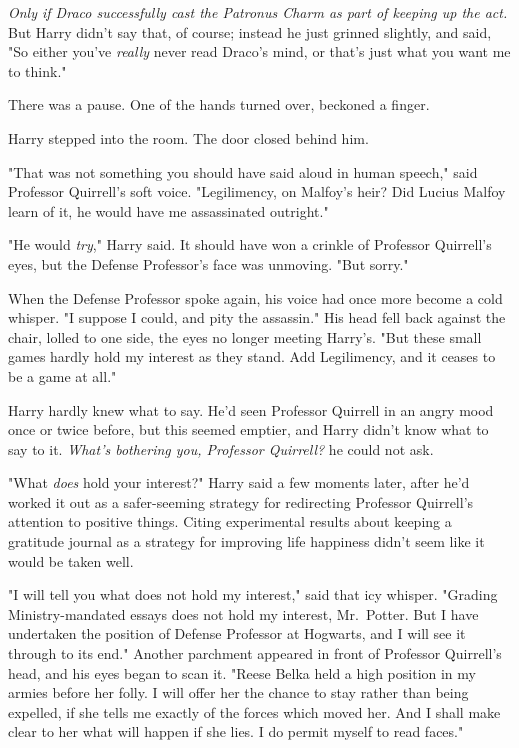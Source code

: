 \emph{Only if Draco successfully cast the Patronus Charm as part of keeping up
the act.} But Harry didn't say that, of course; instead he just grinned
slightly, and said, "So either you've \emph{really} never read Draco's mind, or
that's just what you want me to think."

There was a pause. One of the hands turned over, beckoned a finger.

Harry stepped into the room. The door closed behind him.

"That was not something you should have said aloud in human speech," said
Professor Quirrell's soft voice. "Legilimency, on Malfoy's heir? Did Lucius
Malfoy learn of it, he would have me assassinated outright."

"He would \emph{try}," Harry said. It should have won a crinkle of Professor
Quirrell's eyes, but the Defense Professor's face was unmoving. "But sorry."

When the Defense Professor spoke again, his voice had once more become a cold
whisper. "I suppose I could, and pity the assassin." His head fell back against
the chair, lolled to one side, the eyes no longer meeting Harry's. "But these
small games hardly hold my interest as they stand. Add Legilimency, and it
ceases to be a game at all."

Harry hardly knew what to say. He'd seen Professor Quirrell in an angry mood
once or twice before, but this seemed emptier, and Harry didn't know what to
say to it. \emph{What's bothering you, Professor Quirrell?} he could not
ask.

"What \emph{does} hold your interest?" Harry said a few moments later, after
he'd worked it out as a safer-seeming strategy for redirecting Professor
Quirrell's attention to positive things. Citing experimental results about
keeping a gratitude journal as a strategy for improving life happiness didn't
seem like it would be taken well.

"I will tell you what does not hold my interest," said that icy whisper.
"Grading Ministry-mandated essays does not hold my interest, Mr.~Potter. But I
have undertaken the position of Defense Professor at Hogwarts, and I will see
it through to its end." Another parchment appeared in front of Professor
Quirrell's head, and his eyes began to scan it. "Reese Belka held a high
position in my armies before her folly. I will offer her the chance to stay
rather than being expelled, if she tells me exactly of the forces which moved
her. And I shall make clear to her what will happen if she lies. I do permit
myself to read faces."


